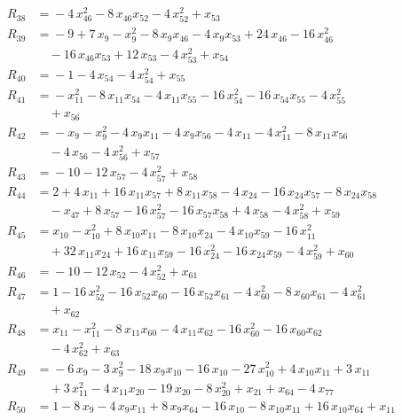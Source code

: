 \begin{align*}
R_{38} &={} -4\,x_{46}^{2} -8\,x_{46} x_{52} -4\,x_{52}^{2} +x_{53} \\[2pt]
R_{39} &={} -9 +7\,x_{9} -x_{9}^{2} -8\,x_{9} x_{46} -4\,x_{9} x_{53} +24\,x_{46} -16\,x_{46}^{2} \\
&\quad{} -16\,x_{46} x_{53} +12\,x_{53} -4\,x_{53}^{2} +x_{54} \\[2pt]
R_{40} &={} -1 -4\,x_{54} -4\,x_{54}^{2} +x_{55} \\[2pt]
R_{41} &={} -x_{11}^{2} -8\,x_{11} x_{54} -4\,x_{11} x_{55} -16\,x_{54}^{2} -16\,x_{54} x_{55} -4\,x_{55}^{2} \\
&\quad{} +x_{56} \\[2pt]
R_{42} &={} -x_{9} -x_{9}^{2} -4\,x_{9} x_{11} -4\,x_{9} x_{56} -4\,x_{11} -4\,x_{11}^{2} -8\,x_{11} x_{56} \\
&\quad{} -4\,x_{56} -4\,x_{56}^{2} +x_{57} \\[2pt]
R_{43} &={} -10 -12\,x_{57} -4\,x_{57}^{2} +x_{58} \\[2pt]
R_{44} &={} 2 +4\,x_{11} +16\,x_{11} x_{57} +8\,x_{11} x_{58} -4\,x_{24} -16\,x_{24} x_{57} -8\,x_{24} x_{58} \\
&\quad{} -x_{47} +8\,x_{57} -16\,x_{57}^{2} -16\,x_{57} x_{58} +4\,x_{58} -4\,x_{58}^{2} +x_{59} \\[2pt]
R_{45} &={} x_{10} -x_{10}^{2} +8\,x_{10} x_{11} -8\,x_{10} x_{24} -4\,x_{10} x_{59} -16\,x_{11}^{2} \\
&\quad{} +32\,x_{11} x_{24} +16\,x_{11} x_{59} -16\,x_{24}^{2} -16\,x_{24} x_{59} -4\,x_{59}^{2} +x_{60} \\[2pt]
R_{46} &={} -10 -12\,x_{52} -4\,x_{52}^{2} +x_{61} \\[2pt]
R_{47} &={} 1 -16\,x_{52}^{2} -16\,x_{52} x_{60} -16\,x_{52} x_{61} -4\,x_{60}^{2} -8\,x_{60} x_{61} -4\,x_{61}^{2} \\
&\quad{} +x_{62} \\[2pt]
R_{48} &={} x_{11} -x_{11}^{2} -8\,x_{11} x_{60} -4\,x_{11} x_{62} -16\,x_{60}^{2} -16\,x_{60} x_{62} \\
&\quad{} -4\,x_{62}^{2} +x_{63} \\[2pt]
R_{49} &={} -6\,x_{9} -3\,x_{9}^{2} -18\,x_{9} x_{10} -16\,x_{10} -27\,x_{10}^{2} +4\,x_{10} x_{11} +3\,x_{11} \\
&\quad{} +3\,x_{11}^{2} -4\,x_{11} x_{20} -19\,x_{20} -8\,x_{20}^{2} +x_{21} +x_{64} -4\,x_{77} \\[2pt]
R_{50} &={} 1 -8\,x_{9} -4\,x_{9} x_{11} +8\,x_{9} x_{64} -16\,x_{10} -8\,x_{10} x_{11} +16\,x_{10} x_{64} +x_{11} \\

\end{align*}
